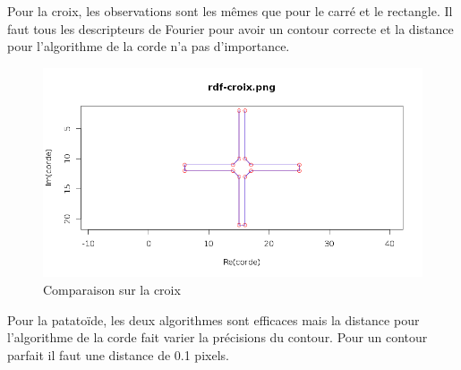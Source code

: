\documentclass[11pt]{article}
\begin{document}
  \newpage
  
  Pour la croix, les observations sont les mêmes que pour le carré et le rectangle. Il faut tous
  les descripteurs de Fourier pour avoir un contour correcte et la distance pour l'algorithme de la 
  corde n'a pas d'importance.
  
  \begin{center}
    \begin{figure}[!h]
      \includegraphics[width=15cm]{../resultat/comp_croix.png}
      \caption{Comparaison sur la croix}
    \end{figure}
  \end{center}
  
  \newpage
  
  Pour la patatoïde, les deux algorithmes sont efficaces mais la distance pour l'algorithme de la corde
  fait varier la précisions du contour. Pour un contour parfait il faut une distance de 0.1 pixels.
  
\end{document}
